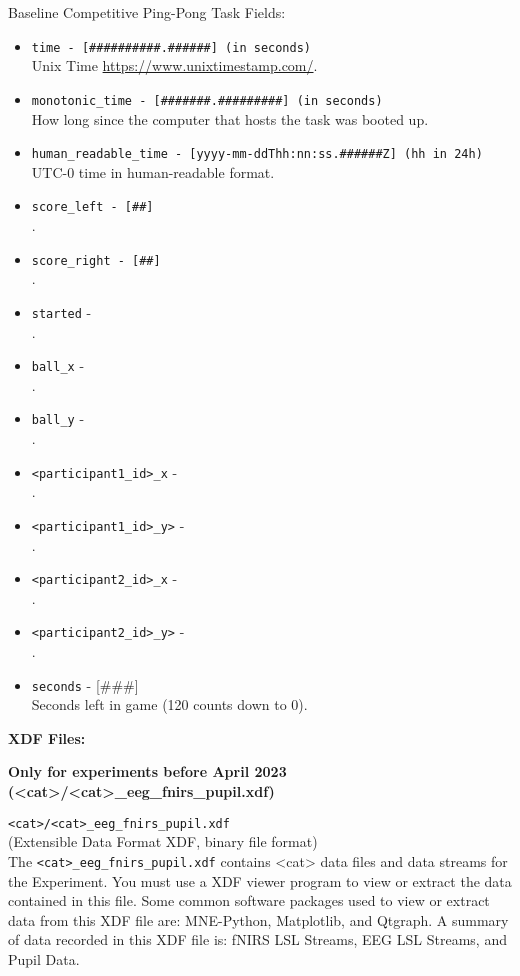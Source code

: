 \begin{description}
Baseline Competitive Ping-Pong Task Fields:
\begin{itemize}
    \item \verb|time - [##########.######] (in seconds)|\\
        Unix Time \href{https://www.unixtimestamp.com/}{https://www.unixtimestamp.com/}.
    \item \verb|monotonic_time - [#######.#########] (in seconds)|\\
        How long since the computer that hosts the task was booted up.
    \item \verb|human_readable_time - [yyyy-mm-ddThh:nn:ss.######Z] (hh in 24h)|\\
        UTC-0 time in human-readable format.
    \item \verb|score_left - [##]|\\.
    \item \verb|score_right - [##]|\\.
    \item \verb|started| - \\.
    \item \verb|ball_x| - \\.
    \item \verb|ball_y| - \\.
    \item \verb|<participant1_id>_x| -\\.
    \item \verb|<participant1_id>_y>| -\\.
    \item \verb|<participant2_id>_x| -\\.
    \item \verb|<participant2_id>_y>| -\\.
    \item \verb|seconds| - [\#\#\#]\\
        Seconds left in game (120 counts down to 0).
\end{itemize}


\bigskip\bigskip\bigskip
\item\textbf{XDF Files:}
\begin{addmargin}[0em]{0em}
    \item\textbf{Only for experiments before April 2023 (<cat>/<cat>\_eeg\_fnirs\_pupil.xdf)}\\
    \item\verb|<cat>/<cat>_eeg_fnirs_pupil.xdf|\\
        (Extensible Data Format XDF, binary file format)\\
        The \verb|<cat>_eeg_fnirs_pupil.xdf| contains <cat> data files and data
        streams for the Experiment. You must use a XDF viewer program to view
        or extract the data contained in this file. Some common software
        packages used to view or extract data from this XDF file are:
        MNE-Python, Matplotlib, and Qtgraph. A summary of data recorded in this
        XDF file is: fNIRS LSL Streams, EEG LSL Streams, and Pupil Data.


\end{addmargin}
\end{description}
